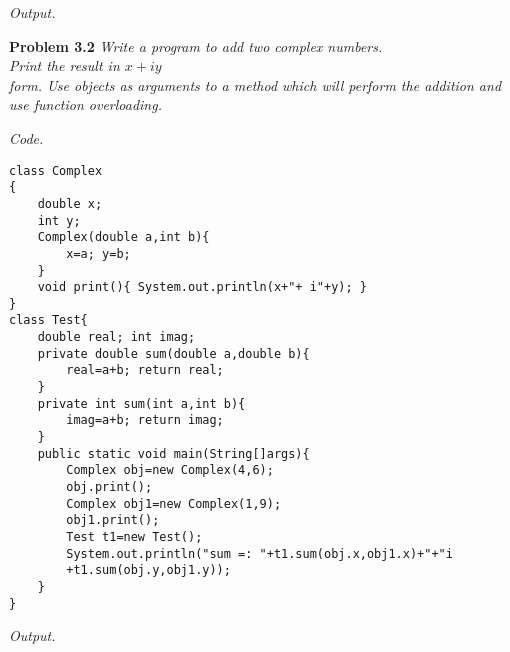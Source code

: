 \documentclass[12pt]{article}
\begin{document}
\textit{Output.}


\textbf{Problem 3.2} \textit{Write a program to add two complex numbers.\\
Print the result in \(x+iy\)\\
form. Use objects as arguments to a method which will perform the addition
and use function overloading.}


\textit{Code.}

\begin{lstlisting}
class Complex
{
	double x;
	int y;
	Complex(double a,int b){
		x=a; y=b;
	}
	void print(){ System.out.println(x+"+ i"+y); }
}
class Test{
	double real; int imag;
	private double sum(double a,double b){
		real=a+b; return real;
	}
	private int sum(int a,int b){
		imag=a+b; return imag;
	}
	public static void main(String[]args){
		Complex obj=new Complex(4,6);
		obj.print();
		Complex obj1=new Complex(1,9);
		obj1.print();
		Test t1=new Test();
		System.out.println("sum =: "+t1.sum(obj.x,obj1.x)+"+"i
		+t1.sum(obj.y,obj1.y));
	}
}

\end{lstlisting}

\textit{Output.}

\newpage




\end{document}

